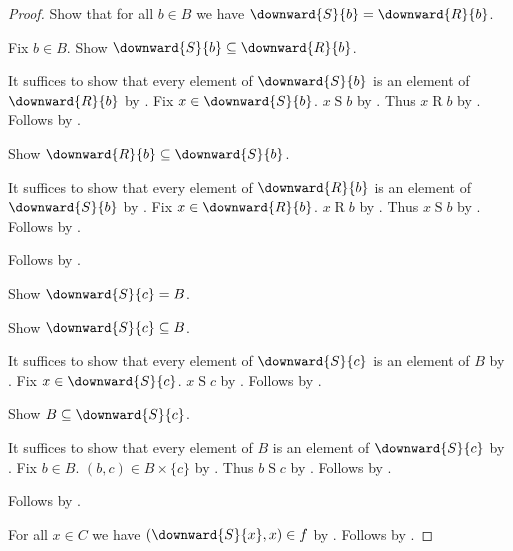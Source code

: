 \begin{proof}
    Show that for all $b\in B$ we have $\downward{S}{b}=\downward{R}{b}$.
    \begin{subproof}
        Fix $b\in B$.
        Show $\downward{S}{b}\subseteq\downward{R}{b}$.
        \begin{subproof}
            It suffices to show that every element of $\downward{S}{b}$ is an element of $\downward{R}{b}$
                by .
            Fix $x\in\downward{S}{b}$.
            $x\mathrel{S}b$ by .
            Thus $x\mathrel{R}b$ by .
            Follows by .
        \end{subproof}
        Show $\downward{R}{b}\subseteq\downward{S}{b}$.
        \begin{subproof}
            It suffices to show that every element of $\downward{R}{b}$ is an element of $\downward{S}{b}$
                by .
            Fix $x\in\downward{R}{b}$.
            $x\mathrel{R}b$ by .
            Thus $x\mathrel{S}b$ by .
            Follows by .
        \end{subproof}
        Follows by .
    \end{subproof}

    Show $\downward{S}{c}=B$.
    \begin{subproof}
        Show $\downward{S}{c}\subseteq B$.
        \begin{subproof}
            It suffices to show that every element of $\downward{S}{c}$ is an element of $B$
                by .
            Fix $x\in\downward{S}{c}$.
            $x\mathrel{S}c$ by .
            Follows by .
        \end{subproof}
        Show $B\subseteq\downward{S}{c}$.
        \begin{subproof}
            It suffices to show that every element of $B$ is an element of $\downward{S}{c}$
                by .
            Fix $b\in B$.
            $(b,c)\in B\times\{c\}$ by .
            Thus $b\mathrel{S}c$ by .
            Follows by .
        \end{subproof}
        Follows by .
    \end{subproof}

    For all $x\in C$ we have $(\downward{S}{x},x)\in f$
        by .
    Follows by .
\end{proof}

